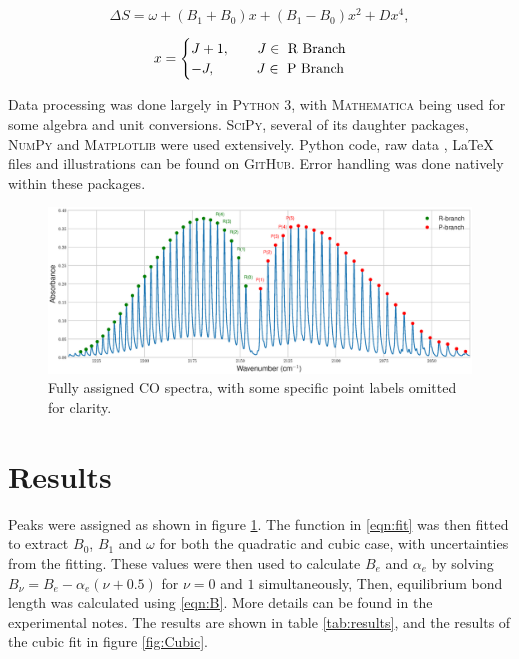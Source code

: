 \documentclass[aps,prl,reprint,10pt,amsmath,amssymb,superscriptaddress,a4paper]{revtex4-2}
\begin{document}
\begin{equation}
\label{eqn:fit}
\Delta S = \omega + \left( B_1 + B_0 \right) x + \left( B_1 - B_0 \right) x^2 + D x^4,
\end{equation}

\[ x = 
\begin{cases}
J + 1, \qquad J \in \textnormal{ R Branch }  \\
-J,    \qquad  \quad J \in \textnormal{ P Branch}
\end{cases}
\]

Data processing was done largely in \textsc{Python 3}, with \textsc{Mathematica} being used for some algebra and unit conversions. \textsc{SciPy}, several of its daughter packages, \textsc{NumPy} and \textsc{Matplotlib} were used extensively. Python code, raw data , {\LaTeX} files and illustrations can be found on \textsc{GitHub}\cite{GitHub}. Error handling was done natively within these packages.

\begin{figure}[t]
\centering
\includegraphics[width = 16 cm]{FormalExport.eps}
\caption{Fully assigned CO spectra, with some specific point labels omitted for clarity.}
\label{fig:spectra}
\end{figure}

\section{Results}

Peaks were assigned as shown in figure \ref{fig:spectra}. The function in \ref{eqn:fit} was then fitted to extract $B_0$, $B_1$ and $\omega$ for both the quadratic and cubic case, with uncertainties from the fitting. These values were then used to calculate $B_e$ and $\alpha_e$ by solving $B_\nu = B_e - \alpha_e \left( \nu + 0.5 \right)$ for $\nu = 0$ and $1$ simultaneously, Then, equilibrium bond length was calculated using \ref{eqn:B}. More details can be found in the experimental notes\cite{notes}. The results are shown in table \ref{tab:results}, and the results of the cubic fit in figure \ref{fig:Cubic}.
\end{document}
